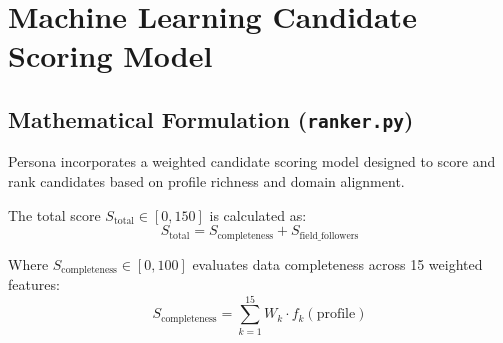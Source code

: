 \documentclass[11pt,a4paper]{report}
\begin{document}
\chapter{Machine Learning Candidate Scoring Model}

\section{Mathematical Formulation (\texttt{ranker.py})}
Persona incorporates a weighted candidate scoring model designed to score and rank candidates based on profile richness and domain alignment.

The total score $S_{\text{total}} \in [0, 150]$ is calculated as:
\begin{equation}
    S_{\text{total}} = S_{\text{completeness}} + S_{\text{field\_followers}}
\end{equation}

Where $S_{\text{completeness}} \in [0, 100]$ evaluates data completeness across 15 weighted features:
\begin{equation}
    S_{\text{completeness}} = \sum_{k=1}^{15} W_k \cdot f_k(\text{profile})
\end{equation}
\end{document}
